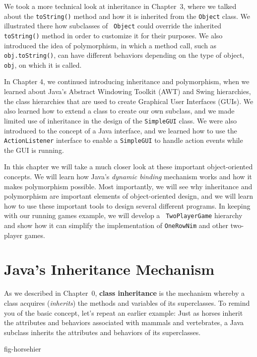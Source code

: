 We took a more technical look at inheritance in Chapter~3, where we
talked about the {\tt toString()} method and how it is inherited from
the {\tt Object} class. We illustrated there how subclasses of {\tt
Object} could override the inherited {\tt toString()} method in order
to customize it for their purposes. We also introduced the idea of
polymorphism, in which a method call, such as {\tt obj.toString()},
can have different behaviors depending on the type of object, {\tt
obj}, on which it is called.

In Chapter 4, we continued introducing inheritance and polymorphism,
when we learned about Java's Abstract Windowing Toolkit (AWT) and
Swing hierarchies, the class hierarchies that are used to create
Graphical User Interfaces (GUIs).  We also learned how to extend a
class to create our own subclass, and we made limited use of
inheritance in the design of the {\tt SimpleGUI} class.  We were also
introduced to the concept of a Java interface, and we learned how to
use the {\tt ActionListener} interface to enable a {\tt SimpleGUI} to
handle action events while the GUI is running.

In this chapter we will take a much closer look at these important
object-oriented concepts.  We will learn how Java's {\em dynamic
binding} mechanism works and how it makes polymorphism possible.  Most
importantly, we will see why inheritance and polymorphism are
important elements of object-oriented design, and we will learn how to
use these important tools to design several different programs.  In
keeping with our running games example, we will develop a {\tt
TwoPlayerGame} hierarchy and show how it can simplify the
implementation of {\tt OneRowNim} and other two-player games.

\section{Java's Inheritance Mechanism}
\label{javas-inheritance-mechanism}

As we described in Chapter~0, {\bf class inheritance} is the mechanism
whereby a class acquires ({\em inherits}) the methods and variables of
its superclasses.  To remind you of the basic concept, let's repeat an
earlier example: Just as horses inherit the attributes and behaviors
associated with mammals and vertebrates, a Java subclass inherits the
attributes and behaviors of its superclasses.

{fig-horsehier}

